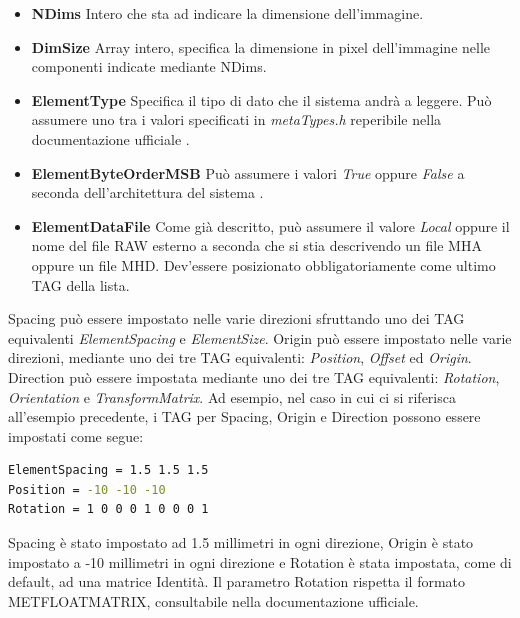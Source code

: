 \documentclass[a4paper,12pt, doubleside]{report}
\begin{document}
                    \begin{itemize}
                        \item \textbf{NDims} Intero che sta ad indicare la dimensione dell'immagine.
                        \item \textbf{DimSize} Array intero, specifica la dimensione in pixel dell'immagine nelle componenti indicate mediante NDims.
                        \item \textbf{ElementType} Specifica il tipo di dato che il sistema andrà a leggere. Può assumere uno tra i valori specificati in \textit{metaTypes.h} reperibile nella documentazione ufficiale \cite{mha-doc}.
                        \item \textbf{ElementByteOrderMSB} Può assumere i valori \textit{True} oppure \textit{False} a seconda dell'architettura del sistema \cite{endianness}.
                        \item \textbf{ElementDataFile} Come già descritto, può assumere il valore \textit{Local} oppure il nome del file RAW esterno a seconda che si stia descrivendo un file MHA oppure un file MHD. Dev'essere posizionato obbligatoriamente come ultimo TAG della lista.
                    \end{itemize}
                    
                    Spacing può essere impostato nelle varie direzioni sfruttando uno dei TAG equivalenti \textit{ElementSpacing} e \textit{ElementSize}. Origin può essere impostato nelle varie direzioni, mediante uno dei tre TAG equivalenti: \textit{Position}, \textit{Offset} ed \textit{Origin}. Direction può essere impostata mediante uno dei tre TAG equivalenti: \textit{Rotation}, \textit{Orientation} e \textit{TransformMatrix}. Ad esempio, nel caso in cui ci si riferisca all'esempio precedente, i TAG per Spacing, Origin e Direction possono essere impostati come segue:
                    
                    \begin{lstlisting}[language=bash, frame=bt]
ElementSpacing = 1.5 1.5 1.5
Position = -10 -10 -10
Rotation = 1 0 0 0 1 0 0 0 1
                    \end{lstlisting}
                    
                    Spacing è stato impostato ad 1.5 millimetri in ogni direzione, Origin è stato impostato a -10 millimetri in ogni direzione e Rotation è stata impostata, come di default, ad una matrice Identità. Il parametro Rotation rispetta il formato MET\textunderscore FLOAT\textunderscore MATRIX, consultabile nella documentazione ufficiale.
                                     
\end{document}
